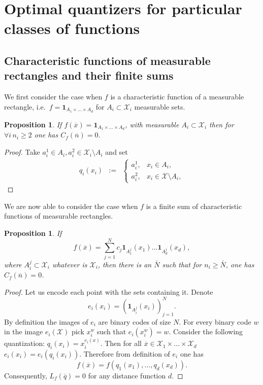 \documentclass{amsart}
\newtheorem{proposition}[theorem]{Proposition}
\theoremstyle{remark}
\numberwithin{equation}{section}
\numberwithin{figure}{section}
\def\mX{\mathcal{X}}
\def\v{\overline}
\begin{document}
\section{Optimal quantizers for particular classes of functions}

\subsection{Characteristic functions of measurable rectangles and their finite sums}

We first consider the case when $f$ is a characteristic function of a measurable rectangle, i.e.\ $f=\mathbf{1}_{A_1 \times \ldots \times A_d}$  for
$A_i \subset\mX_i$ measurable sets.  

\begin{proposition}
	If $f(\v x)= \mathbf{1}_{A_1\times \ldots \times A_d}$, with measurable $A_i \subset\mX_i$ then for $\forall i \, n_i\geq 2$ one has $C_f(\v n)=0$.
\end{proposition}

\begin{proof}
	Take $a_{i}^{1}\in A_i, a_i^2 \in \mX_i \setminus A_i$ and set
		\begin{eqnarray*}
		q_i(x_i) &:=&
		\left\{
		\begin{array}{rl}
			a_{i}^1, & x_i\in A_i,\\
			a_{i}^2, & x_i\in \mX \setminus A_i,
		\end{array} 
		\right. 
	\end{eqnarray*}
	
\end{proof}	


We are now able to consider the case when $f$ is a finite sum of characteristic functions of measurable rectangles.

\begin{proposition}
	If 
	\[f(\v x)=\sum_{j=1}^N c_j \mathbf{1}_{A_1^j}(x_1)\ldots \mathbf{1}_{A_d^j}(x_d),\]
	where $A_i^j \subset \mX_i$ whatever is $\mX_i$, then 
	there is an $\bar N$ such that for $n_i \geq \bar N$, one has $C_f(\v n) = 0$.
\end{proposition}

\begin{proof} Let us encode each point with the sets containing it. Denote 
\[ 
e_i(x_i) = \left( \mathbf{1}_{ A_i^j }(x_i)\right)_{j=1}^N.
\] 
By definition the images of $e_i$ are binary codes of size $N$. For every binary code $w$ in the image $e_i(\mX)$ pick $x_i^w$ such that $e_i(x_i^w) = w$. Consider the following quantization: $q_i(x_i) = x_i^{e_i(x)}$. Then for all $\v x \in \mX_1\times\ldots\times \mX_d$ $e_i(x_i) = e_i(q_i(x_i))$. Therefore from definition of $e_i$ one has
	\[
	f(\v x) = f(q_1(x_1),\ldots, q_d(x_d)).
	\]
	Consequently, $L_f(\v q) = 0$ for any distance function $d$.
\end{proof}
\end{document}
